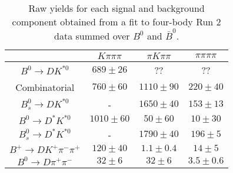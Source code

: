 \begin{table}
  \centering
  \begin{tabular}{cccc}
      \toprule
       & $K\pi\pi\pi$ & $\pi K\pi\pi$ & $\pi\pi\pi\pi$ \\
      \midrule
      $B^0 \to DK^{*0}$ & $689 \pm 26$ & ?? & ?? \\
      Combinatorial & $760 \pm 60$ & $1110 \pm 90$ & $220 \pm 40$ \\
      $B^0_s \to DK^{*0}$ & \-- & $1650 \pm 40$ & $153 \pm 13$ \\
      $B^0 \to D^*K^{*0}$ & $1010 \pm 60$ & $50 \pm 60$ & $10 \pm 30$ \\
      $B^0_s \to D^*K^{*0}$ & \-- & $1790 \pm 40$ & $196 \pm 5$ \\
      $B^+ \to DK^+\pi^-\pi^+$ & $120 \pm 40$ & $1.1 \pm 0.4$ & $14 \pm 5$ \\
      $B^0 \to D\pi^+\pi^-$ & $32 \pm 6$ & $32 \pm 6$ & $3.5 \pm 0.6$ \\
      \bottomrule
      \end{tabular}
  \caption{Raw yields for each signal and background component obtained from a fit to four-body Run 2 data summed over $B^0$ and $\bar{B}^0$.}
\label{tab:yields_combined_4body_run2}
\end{table}
